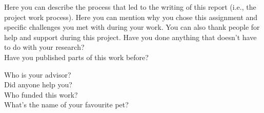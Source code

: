 \newpage
 Here you can describe the process that led to the writing of this report (i.e., the project work process). Here you can mention why you chose this assignment and specific challenges you met with during your work. You can also thank people for help and support during this project.
Have you done anything that doesn't have to do with your research?
\\ Have you published parts of this work before?

Who is your advisor?
\\
Did anyone help you?
\\
Who funded this work?
\\
What's the name of your favourite pet?